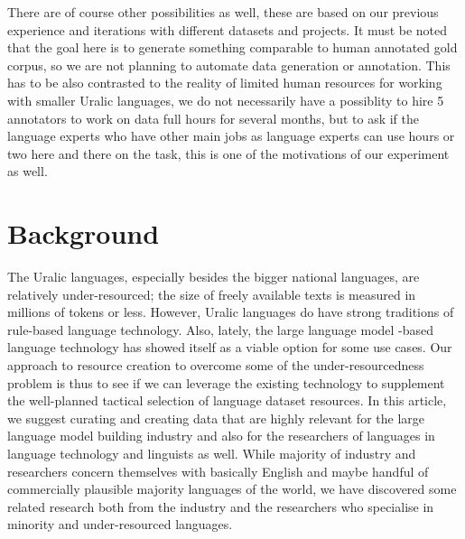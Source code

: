 \documentclass[free]{flammie}
\begin{document}
There are of course other possibilities as well, these are based on our previous
experience and iterations with different datasets and projects. It must be noted
that the goal here is to generate something comparable to human annotated gold
corpus, so we are not planning to automate data generation or annotation. This
has to be also contrasted to the reality of limited human resources for working
with smaller Uralic languages, we do not necessarily have a possiblity to hire 5
annotators to work on data full hours for several months, but to ask if the
language experts who have other main jobs as language experts can use hours or
two here and there on the task, this is one of the motivations of our experiment
as well.

\section{Background}

The Uralic languages, especially besides the bigger national languages, are
relatively under-resourced; the size of freely available texts is measured in
millions of tokens or less.  However, Uralic languages do have strong traditions
of rule-based language technology.  Also, lately, the large language model
-based language technology has showed itself as a viable option for some use
cases.  Our approach to resource creation to overcome some of the
under-resourcedness problem is thus to see if we can leverage the existing
technology to supplement the well-planned tactical selection of language dataset
resources.  In this article, we suggest curating and creating data that are
highly relevant for the large language model building industry and also for the
researchers of languages in language technology and linguists as well.  While
majority of industry and researchers concern themselves with basically English
and maybe handful of commercially plausible majority languages of the world, we
have discovered some related research both from the industry and the researchers
who specialise in minority and under-resourced languages.
\end{document}
